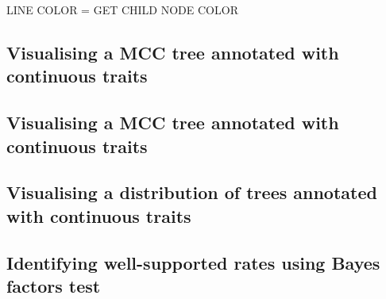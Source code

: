 \documentclass[english]{paper}
\begin{document}

LINE COLOR = GET CHILD NODE COLOR
\subsection{Visualising a MCC tree annotated with continuous traits}
% 

\subsection{Visualising a MCC tree annotated with continuous traits}
\label{JSONmerge}


\subsection{Visualising a distribution of trees annotated with continuous traits}


\subsection{Identifying well-supported rates using Bayes factors test}

% 
%
\end{document}

